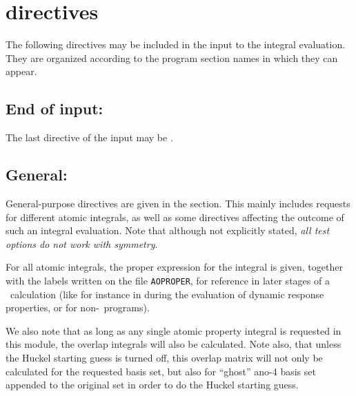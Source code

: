 \section{ directives}\label{sec:herinp}

          The following directives may be included in the input to
the integral evaluation.  They are organized according to the program
section names in which they can appear.

\subsection{End of input: }

The last directive of the  input may be .

\subsection{General: }



General-purpose directives are given in the 
section. This mainly includes requests for different atomic integrals,
as well as some
directives affecting the outcome of such an integral evaluation. Note
that although not explicitly stated, {\em all test options do not
work with symmetry}.

For all atomic integrals, the proper expression for the integral is
given, together with the labels written on the file
\texttt{AOPROPER}, for
reference in later stages of a \siraba\ calculation (like for instance
in during the evaluation of dynamic response properties, or for
non-\siraba\ programs).

We also note that as long as any single atomic property
integral is
requested in this module, the overlap integrals will also be
calculated. Note also, that unless the Huckel starting guess is turned
off, this overlap matrix will not only be calculated for the requested
basis set, but also for ``ghost'' ano-4 basis set appended to the
original set in order to do the Huckel starting guess.

